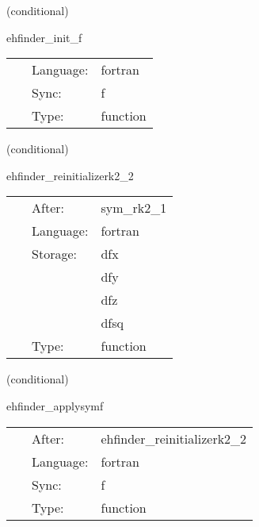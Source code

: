 \vspace{5mm}

   (conditional) 

\hspace{5mm} ehfinder\_init\_f 

\hspace{5mm}{\it setup the initial surface } 


\hspace{5mm}

 \begin{tabular*}{160mm}{cll} 
~ & Language:  & fortran \\ 
~ & Sync:  & f \\ 
~ & Type:  & function \\ 
\end{tabular*} 


\vspace{5mm}

   (conditional) 

\hspace{5mm} ehfinder\_reinitializerk2\_2 

\hspace{5mm}{\it rk2 scheme step 2 } 


\hspace{5mm}

 \begin{tabular*}{160mm}{cll} 
~ & After:  & sym\_rk2\_1 \\ 
~ & Language:  & fortran \\ 
~ & Storage:  & dfx \\ 
~& ~ &dfy\\ 
~& ~ &dfz\\ 
~& ~ &dfsq\\ 
~ & Type:  & function \\ 
\end{tabular*} 


\vspace{5mm}

   (conditional) 

\hspace{5mm} ehfinder\_applysymf 

\hspace{5mm}{\it select f for boundary conditions } 


\hspace{5mm}

 \begin{tabular*}{160mm}{cll} 
~ & After:  & ehfinder\_reinitializerk2\_2 \\ 
~ & Language:  & fortran \\ 
~ & Sync:  & f \\ 
~ & Type:  & function \\ 
\end{tabular*} 


